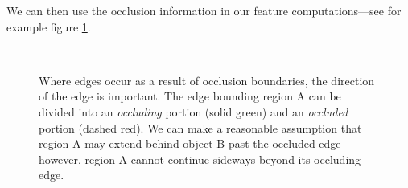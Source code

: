 \documentclass[10pt,twocolumn,letterpaper]{article}
\newcommand{\point}{\mathbf{p}}
\begin{document}
We can then use the occlusion information in our feature computations---see for example figure \ref{fig:occluded_region}.

\begin{figure}
    \centering 
        \hfill
     \\
    \caption{Where edges occur as a result of occlusion boundaries, the direction of the edge is important. The edge bounding region A can be divided into an \emph{occluding} portion (solid green) and an \emph{occluded} portion (dashed red).
    We can make a reasonable assumption that region A may extend behind object B past the occluded edge---however, region A cannot continue sideways beyond its occluding edge.}
    \label{fig:occluded_region}
\end{figure}


\end{document}
